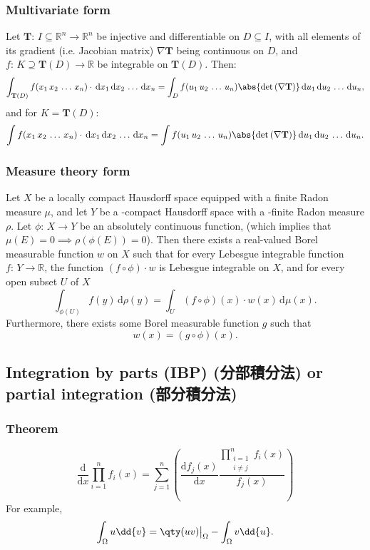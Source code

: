 \documentclass[a4paper,12pt]{report}
\begin{document}
\subsubsection{Multivariate form}
Let $\mathbf{T}:\,I\subseteq\mathbb{R}^n\to\mathbb{R}^n$ be injective and differentiable on $D\subseteq I$, with all elements of its gradient (i.e. Jacobian matrix) $\nabla\mathbf{T}$ being continuous on $D$, and $f:\,K\supseteq\mathbf{T}(D)\to\mathbb{R}$ be integrable on $\mathbf{T}(D)$. Then:
\[\int_{\mathbf{T}(D)}f(x_1\,x_2\,\dots\,x_n)\cdot\,\mathrm{d}x_1\,\mathrm{d}x_2\,\dots\,\mathrm{d}x_n=\int_D f(u_1\,u_2\,\dots\,u_n)\abs{\det\left(\nabla\mathbf{T}\right)}\,\mathrm{d}u_1\,\mathrm{d}u_2\,\dots\,\mathrm{d}u_n,\]
and for $K=\mathbf{T}(D)$:
\[\int f(x_1\,x_2\,\dots\,x_n)\cdot\,\mathrm{d}x_1\,\mathrm{d}x_2\,\dots\,\mathrm{d}x_n=\int f(u_1\,u_2\,\dots\,u_n)\abs{\det\left(\nabla\mathbf{T}\right)}\,\mathrm{d}u_1\,\mathrm{d}u_2\,\dots\,\mathrm{d}u_n.\]
\subsubsection{Measure theory form}
Let $X$ be a locally compact Hausdorff space equipped with a finite Radon measure $μ$, and let $Y$ be a \text{\textsigma}-compact Hausdorff space with a \text{\textsigma}-finite Radon measure $\rho$. Let $\phi:\,X\to Y$ be an absolutely continuous function, (which implies that $\mu(E)=0\implies\rho(\phi(E))=0$). Then there exists a real-valued Borel measurable function $w$ on $X$ such that for every Lebesgue integrable function $f:\,Y\to\mathbb{R}$, the function $(f\circ\phi)\cdot w$ is Lebesgue integrable on $X$, and for every open subset $U$ of $X$
\[\int_{\phi(U)}f(y)\,\mathrm{d}\rho(y)=\int_U(f\circ\phi)(x)\cdot w(x)\,\mathrm{d}\mu(x).\]
Furthermore, there exists some Borel measurable function $g$ such that 
\[w(x)=(g\circ\phi)(x).\]
\subsection{Integration by parts (IBP) (分部積分法) or partial integration (部分積分法)}
\subsubsection{Theorem}
\[\frac{\mathrm{d}}{\mathrm{d}x}\prod_{i=1}^nf_i(x)=\sum_{j=1}^n\left(\frac{\mathrm{d}f_j(x)}{\mathrm{d}x}\frac{\prod_{\substack{i=1\\i\neq j}}^n f_i(x)}{f_j(x)}\right)\]
For example,
\[\int_{\Omega} u\dd{v} = \qty(u v)\big\vert_{\Omega} - \int_{\Omega} v\dd{u}.\]
\end{document}
